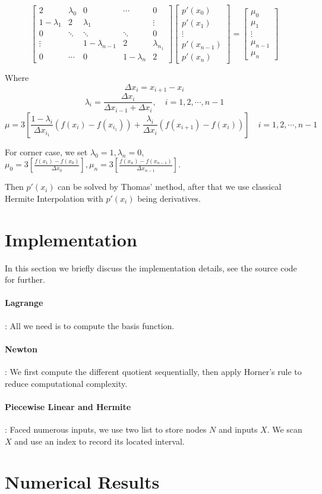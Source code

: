 \documentclass{article}
\begin{document}
\begin{equation}
\begin{bmatrix}
2 &\lambda_0& 0 & \cdots & 0\\
1 - \lambda_1 & 2 & \lambda_1  & & \vdots\\
0 & \ddots &\ddots & \ddots & 0 \\
\vdots &  &  1-\lambda_{n-1}  & 2 & \lambda_{n_1} \\ 
0 & \cdots & 0 & 1-\lambda_n & 2
\end{bmatrix}
\begin{bmatrix}
p'(x_0)\\
p'(x_1)\\
\vdots\\
p'(x_{n-1})\\
p'(x_n)
\end{bmatrix} = 
\begin{bmatrix}
\mu_0\\
\mu_1\\
\vdots\\
\mu_{n-1}\\
\mu_n
\end{bmatrix}
\end{equation}

Where 
$$\Delta x_{i} = x_{i+1} - x_{i}$$
$$\lambda_i = \frac{\Delta x_i}{\Delta x_{i-1} + \Delta x_i}, \quad i = 1,2,\cdots, n-1$$
$$\mu = 3 [ \frac{1 - \lambda_i}{\Delta x_{i_1}}(f(x_i) - f(x_{i_1})) + \frac{ \lambda_i}{\Delta x_{i}}(f(x_{i+1}) - f(x_i))] \quad i = 1,2,\cdots, n-1$$

For corner case, we set $\lambda_0 = 1, \lambda_n = 0$, $ \mu_0 = 3[\frac{f(x_1) - f(x_0)}{\Delta x_0}], \mu_n = 3[\frac{f(x_n) - f(x_{n-1})}{\Delta x_{n-1}}]$. 

Then $p'(x_i)$ can be solved by Thomas' method, after that we use classical Hermite Interpolation with $p'(x_i)$ being derivatives.

\section{Implementation}
In this section we briefly discuss the implementation details, see the source code for further. 
\paragraph{Lagrange}: All we need is to compute the basis function.
\paragraph{Newton}: We first compute the different quotient sequentially, then apply Horner's rule to reduce computational complexity.
\paragraph{Piecewise Linear and Hermite}:  Faced numerous inputs, we use two list to store nodes $N$ and inputs $X$. We scan $X$ and use an index to record its located interval. 
\section{Numerical Results}

\end{document}
